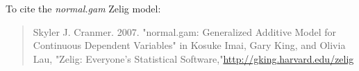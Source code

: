 To cite the \emph{ normal.gam } Zelig model:
 \begin{verse}
 Skyler J. Cranmer. 2007. "normal.gam: Generalized Additive Model for Continuous Dependent Variables" in Kosuke Imai, Gary King, and Olivia Lau, "Zelig: Everyone's Statistical Software,"\url{http://gking.harvard.edu/zelig} 
\end{verse}
